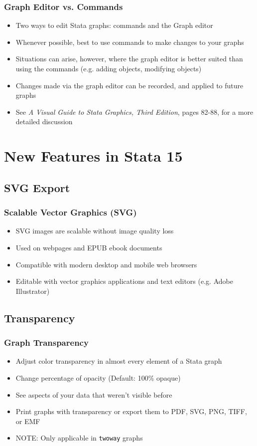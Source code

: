 \documentclass{beamer}
\begin{document}
\begin{frame}
	\frametitle{Graph Editor vs. Commands}
		\begin{itemize}
			\item Two ways to edit Stata graphs: commands and the Graph editor
			\item Whenever possible, best to use commands to make changes to your graphs
			\item Situations can arise, however, where the graph editor is better suited than using the commands (e.g. adding objects, modifying objects)
			\item Changes made via the graph editor can be recorded, and applied to future graphs
			\item See \textit{A Visual Guide to Stata Graphics, Third Edition}, pages 82-88, for a more detailed discussion
		\end{itemize}
\end{frame}

\section{New Features in Stata 15}
\subsection{SVG Export}

\begin{frame}
	\frametitle{Scalable Vector Graphics (SVG)}
		\begin{itemize}
			\item SVG images are scalable without image quality loss
			\item Used on webpages and EPUB ebook documents
			\item Compatible with modern desktop and mobile web browsers
			\item Editable with vector graphics applications and text editors (e.g. Adobe Illustrator)
		\end{itemize}
\end{frame}

\subsection{Transparency}

\begin{frame}
	\frametitle{Graph Transparency}
		\begin{itemize}
			\item Adjust color transparency in almost every element of a Stata graph
			\item Change percentage of opacity (Default: 100\% opaque)
			\item See aspects of your data that weren't visible before
			\item Print graphs with transparency or export them to PDF, SVG, PNG, TIFF, or EMF
			\item NOTE: Only applicable in \texttt{twoway} graphs
		\end{itemize}
\end{frame}
\end{document}
